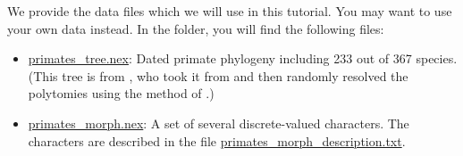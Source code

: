 We provide the data files which we will use in this tutorial.
You may want to use your own data instead.
In the  folder, you will find the following files:
\begin{itemize}

    \item \href{https://github.com/revbayes/revbayes_tutorial/raw/master/RB_DiversificationRate_CharacterDependent_Tutorial/data/primates_tree.nex}{primates\_tree.nex}:
        Dated primate phylogeny including 233 out of 367 species.
        (This tree is from \citealt{MagnusonFord2012}, who took it from \citealt{Vos2006} and then randomly resolved the polytomies using the method of \citealt{Kuhn2011}.)


    \item \href{https://github.com/revbayes/revbayes_tutorial/raw/master/RB_DiversificationRate_CharacterDependent_Tutorial/data/primates_morph.nex}{primates\_morph.nex}:
        A set of several discrete-valued characters. %
        The characters are described in the file \href{https://github.com/revbayes/revbayes_tutorial/raw/master/RB_DiversificationRate_CharacterDependent_Tutorial/data/primates_morph_description.txt}{primates\_morph\_description.txt}.

\end{itemize}



\newpage

